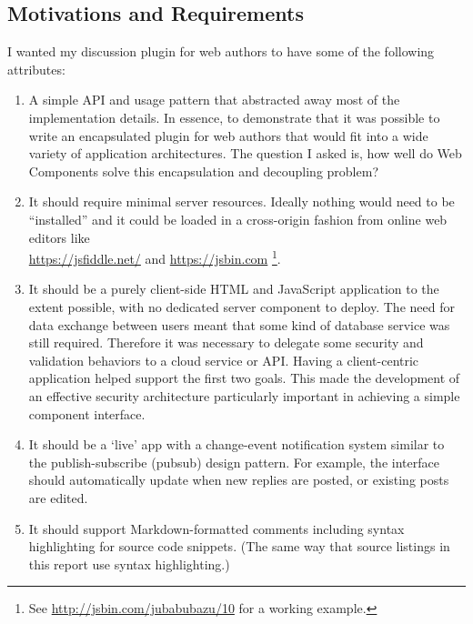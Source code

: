 \subsection{Motivations and Requirements}
\label{motivations}
I wanted my discussion plugin for web authors to have some of the following attributes:
\begin{enumerate}
\item A simple API and usage pattern that abstracted away most of the implementation details. In essence, to demonstrate that it was possible to write an encapsulated plugin for web authors that would fit into a wide variety of application architectures. The question I asked is, how well do Web Components solve this encapsulation and decoupling problem?\label{motive:abstraction}

\item It should require minimal server resources. Ideally nothing would need to be ``installed'' and it could be loaded in a cross-origin fashion from online web editors like \\ \url{https://jsfiddle.net/} and \url{https://jsbin.com}
\footnote{See \url{http://jsbin.com/jubabubazu/10} for a working example.}.
\label{motive:cors}

\item It should be a purely client-side HTML and JavaScript application to the extent possible, 
with no dedicated server component to deploy. 
The need for data exchange between users meant that some kind of database service was still required. 
Therefore it was necessary to delegate some security and validation behaviors to a cloud service or API. 
Having a client-centric application helped support the first two goals. 
This made the development of an effective security architecture particularly important in achieving a simple component interface.

\item It should be a `live' app with a change-event notification system similar to the
publish-subscribe (pubsub) design pattern.\label{motive:pubsub} 
For example, the interface should automatically update when new replies are posted,
or existing posts are edited.

\item It should support Markdown-formatted comments including syntax highlighting for source code snippets. (The same way that source listings in this report use syntax highlighting.)\label{motive:markdown}


\end{enumerate}
